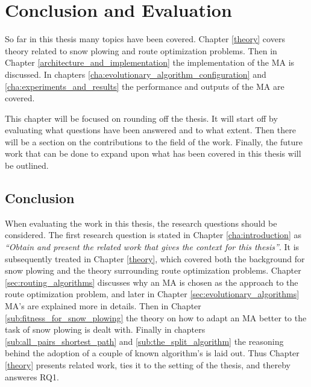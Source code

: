 \chapter{Conclusion and Evaluation}

So far in this thesis many topics have been covered. Chapter \ref{theory} covers theory related to snow plowing and route optimization problems. Then in Chapter \ref{architecture_and_implementation} the implementation of the MA is discussed. In chapters \ref{cha:evolutionary_algorithm_configuration} and \ref{cha:experiments_and_results} the performance and outputs of the MA are covered.

This chapter will be focused on rounding off the thesis. It will start off by evaluating what questions have been answered and to what extent. Then there will be a section on the contributions to the field of the work. Finally, the future work that can be done to expand upon what has been covered in this thesis will be outlined.

\section{Conclusion}

When evaluating the work in this thesis, the research questions should be considered. The first research question is stated in Chapter \ref{cha:introduction} as \emph{\enquote{Obtain and present the related work that gives the context for this thesis}}. It is subsequently treated in Chapter \ref{theory}, which covered both the background for snow plowing and the theory surrounding route optimization problems. Chapter \ref{sec:routing_algorithms} discusses why an MA is chosen as the approach to the route optimization problem, and later in Chapter \ref{sec:evolutionary_algorithms} MA's are explained more in details. Then in Chapter \ref{sub:fitness_for_snow_plowing} the theory on how to adapt an MA better to the task of snow plowing is dealt with. Finally in chapters \ref{sub:all_pairs_shortest_path} and \ref{sub:the_split_algorithm} the reasoning behind the adoption of a couple of known algorithm's is laid out. Thus Chapter \ref{theory} presents related work, ties it to the setting of the thesis, and thereby answeres RQ1.

